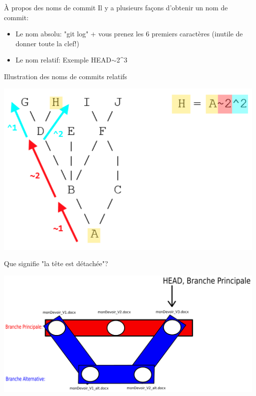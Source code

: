 \documentclass{beamer}
\begin{document}
\begin{frame}{À propos des noms de commit}
Il y a plusieurs façons d'obtenir un nom de commit:
\begin{itemize}
    \item Le nom absolu: "git log" + vous prenez les 6 premiers caractères (inutile de donner toute la clef!)
    \item Le nom relatif: Exemple HEAD$\sim$2\string^3
\end{itemize}
\end{frame}

\begin{frame}{Illustration des noms de commits relatifs}
    \begin{center}
        \includegraphics[scale=0.35]{images/nomCommits/nomCommitRelatif.png}
    \end{center}
\end{frame}

\begin{frame}{Que signifie "la tête est détachée"?}
    \begin{center}
        \includegraphics[scale=0.35]{images/detachedHead/detachedHead0.png}
    \end{center}
\end{frame}
\end{document}

